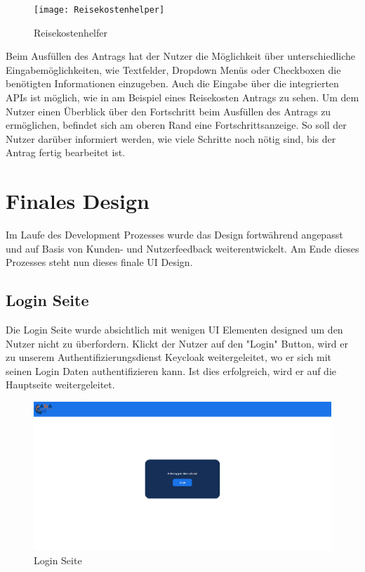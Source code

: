 \begin{figure}[h]
  \centering
    \texttt{[image: Reisekostenhelper]}
    \caption{Reisekostenhelfer}\label{Reisekostenhelfer}
\end{figure}


Beim Ausfüllen des Antrags hat der Nutzer die Möglichkeit über unterschiedliche Eingabemöglichkeiten,
wie Textfelder, Dropdown Menüs oder Checkboxen die benötigten Informationen einzugeben. Auch die Eingabe
über die integrierten \ac{API}s ist möglich, wie in  am Beispiel eines Reisekosten Antrags zu sehen.
Um dem Nutzer einen Überblick über den Fortschritt beim Ausfüllen des Antrags zu ermöglichen, befindet sich am oberen 
Rand eine Fortschrittsanzeige.
So soll der Nutzer darüber informiert werden, wie viele Schritte noch
nötig sind, bis der Antrag fertig bearbeitet ist. 


\section{Finales Design}\label{Finales Design}
Im Laufe des Development Prozesses wurde das Design fortwährend angepasst und auf Basis
von Kunden- und Nutzerfeedback weiterentwickelt. Am Ende dieses Prozesses steht nun 
dieses finale \ac{UI} Design.

\subsection{Login Seite}\label{Login Seite}
Die Login Seite wurde absichtlich mit wenigen \ac{UI} Elementen designed um den Nutzer 
nicht zu überfordern. Klickt der Nutzer auf den "Login" Button, wird er zu unserem 
Authentifizierungsdienst Keycloak weitergeleitet, wo er sich mit seinen Login Daten
authentifizieren kann. Ist dies erfolgreich, wird er auf die Hauptseite weitergeleitet.

\begin{figure}[h]
  \centering
    \includegraphics[width=1.0\textwidth]{Doc/images/Login Page.png}
    \caption{Login Seite}\label{Login Page}
\end{figure}

